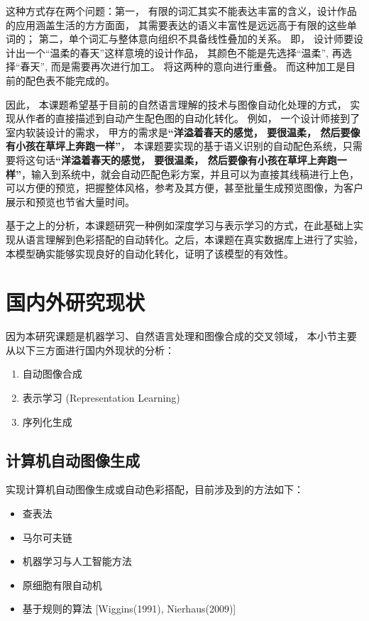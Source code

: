 这种方式存在两个问题：第一， 有限的词汇其实不能表达丰富的含义，设计作品的应用涵盖生活的方方面面， 其需要表达的语义丰富性是远远高于有限的这些单词的； 第二，单个词汇与整体意向组织不具备线性叠加的关系。 即， 设计师要设计出一个“温柔的春天”这样意境的设计作品， 其颜色不能是先选择“温柔”, 再选择“春天”, 而是需要再次进行加工。 将这两种的意向进行重叠。 而这种加工是目前的配色表不能完成的。 

因此， 本课题希望基于目前的自然语言理解的技术与图像自动化处理的方式， 实现从作者的直接描述到自动产生配色图的自动化转化。 例如， 一个设计师接到了室内软装设计的需求， 甲方的需求是\textbf{“洋溢着春天的感觉， 要很温柔， 然后要像有小孩在草坪上奔跑一样”}， 本课题要实现的基于语义识别的自动配色系统，只需要将这句话\textbf{“洋溢着春天的感觉， 要很温柔， 然后要像有小孩在草坪上奔跑一样”}，输入到系统中，就会自动匹配色彩方案，并且可以为直接其线稿进行上色，可以方便的预览，把握整体风格，参考及其方便，甚至批量生成预览图像，为客户展示和预览也节省大量时间。

基于之上的分析，本课题研究一种例如深度学习与表示学习的方式，在此基础上实现从语言理解到色彩搭配的自动转化。之后，本课题在真实数据库上进行了实验，本模型确实能够实现良好的自动化转化，证明了该模型的有效性。 


\section{国内外研究现状}

因为本研究课题是机器学习、自然语言处理和图像合成的交叉领域， 本小节主要从以下三方面进行国内外现状的分析： 

\begin{enumerate}

	\item 自动图像合成
	\item 表示学习 (Representation Learning)
	\item 序列化生成 
	
\end{enumerate}


\subsection{计算机自动图像生成} 实现计算机自动图像生成或自动色彩搭配，目前涉及到的方法如下： 

\begin{itemize}

	\item 查表法
	\item 马尔可夫链
	\item 机器学习与人工智能方法
	\item 原细胞有限自动机
	\item 基于规则的算法 [Wiggins(1991), Nierhaus(2009)]
	
\end{itemize}


